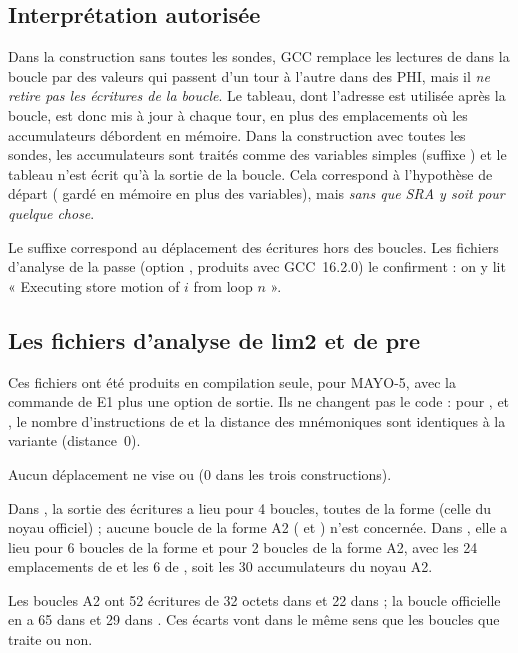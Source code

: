 \subsection{Interprétation autorisée}
\I{} Dans la construction sans toutes les sondes, GCC remplace les lectures de  dans la boucle par des valeurs qui passent d'un tour à l'autre dans des PHI, mais il \emph{ne retire pas les écritures de la boucle}. Le tableau, dont l'adresse est utilisée après la boucle, est donc mis à jour à chaque tour, en plus des emplacements où les accumulateurs débordent en mémoire. Dans la construction avec toutes les sondes, les accumulateurs sont traités comme des variables simples (suffixe ) et le tableau n'est écrit qu'à la sortie de la boucle. \I{} Cela correspond à l'hypothèse de départ ( gardé en mémoire en plus des variables), mais \emph{sans que SRA y soit pour quelque chose}.

\F{} Le suffixe  correspond au déplacement des écritures hors des boucles. Les fichiers d'analyse de la passe  (option , produits avec GCC~16.2.0) le confirment : on y lit « Executing store motion of \code{temp[}$i$\code{]} from loop $n$ ».

\subsection{Les fichiers d'analyse de lim2 et de pre}\label{sec:lim2pre}
Ces fichiers ont été produits en compilation seule, pour MAYO-5, avec la commande de E1 plus une option de sortie. Ils ne changent pas le code : pour ,  et , le nombre d'instructions de  et la distance des mnémoniques sont identiques à la variante  (distance~0).
\begin{description}[leftmargin=0.4cm]
\item[Passe \code{pre}.] \F{} Aucun déplacement ne vise  ou  (0 dans les trois constructions).
\item[Passe \code{lim2}, dans \code{sign_signature_internal}.] \F{} Dans , la sortie des écritures a lieu pour 4 boucles, toutes de la forme  (celle du noyau officiel) ; aucune boucle de la forme A2 ( et ) n'est concernée. Dans , elle a lieu pour 6 boucles de la forme  et pour 2 boucles de la forme A2, avec les 24 emplacements de  et les 6 de , soit les 30 accumulateurs du noyau A2.
\item[Lien avec l'assembleur.] \F{} Les boucles A2 ont 52 écritures de 32 octets dans  et 22 dans  ; la boucle officielle  en a 65 dans  et 29 dans . Ces écarts vont dans le même sens que les boucles que  traite ou non.
\end{description}
